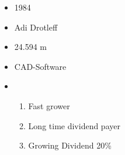 \documentclass[11pt]{scrartcl}
\begin{document}
\begin{minipage}{0,3\linewidth}
    \begin{itemize}[wide, labelsep = 1em, align=center]\scriptsize
        \item [\faAsterisk] 1984
        \item [\faMale] Adi Drotleff
        \item [\faEuro] \faEuro \num{24.594} m
        \item [\faIndustry] CAD-Software
        \item [\faQuestion]
        \begin{enumerate}[wide=\parindent]
            \item Fast grower
            \item Long time dividend payer
            \item Growing Dividend 20\%
        \end{enumerate}
    \end{itemize}
\end{minipage}
\end{document}
